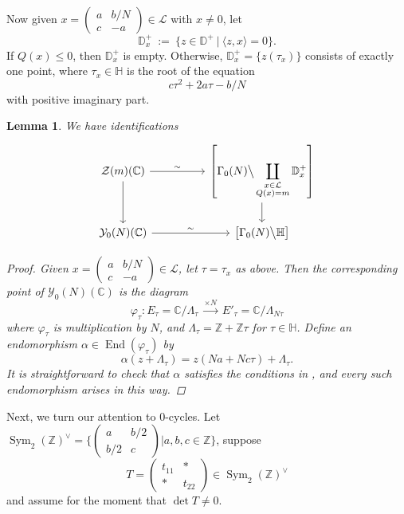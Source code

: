 \documentclass[reqno,oneside]{amsart}
\theoremstyle{plain}
\newtheorem{lemma}[theorem]{Lemma}
\theoremstyle{remark}
\numberwithin{theorem}{section}
\newcommand{\bbC}{\mathbb C}
\newcommand{\bbD}{\mathbb D}
\newcommand{\bbH}{\mathbb H}
\newcommand{\bbZ}{\mathbb Z}
\newcommand{\calL}{\mathcal L}
\newcommand{\calY}{\mathcal Y}
\newcommand{\psm}[1]{\left( \begin{smallmatrix}#1 \end{smallmatrix} \right)}
\DeclareMathOperator{\End}{End}
\DeclareMathOperator{\Sym}{Sym}
\begin{document}
	Now given $x  = \psm {a & b/N \\ c & -a } \in \calL$ with $x \neq 0$, let
	\begin{equation}
	\bbD^+_x \ := \ \{ z \in \bbD^+ \ | \ \langle z, x \rangle = 0  \}.
	\end{equation}
	If $Q(x) \leq 0$, then $\bbD^+_x$ is  empty. Otherwise, $\bbD^+_x = \{  z(\tau_x ) \}$  consists of exactly one point, where $\tau_x \in \bbH$ is the root of the equation
	\begin{equation}
	c \tau^2 + 2 a \tau - b/N
	\end{equation}	
	with positive imaginary part.
	
	\begin{lemma} We have identifications
		\begin{equation}
		\begin{tikzcd}
		\mathcal{Z}(m)(\mathbb C) \arrow[d] \arrow[rr, "\sim"] &  & { \displaystyle \left[ \Gamma_0(N) \big\backslash \coprod_{\substack{x \in \calL \\ Q(x) = m}} \bbD^+_x \right]} \arrow[d]     \\
		\mathcal{Y}_0(N)(\mathbb C) \arrow[rr, "\sim"]         &  & {\left[ \Gamma_0(N) \big\backslash \mathbb H \right]}
		\end{tikzcd}
		\end{equation}
		\begin{proof}
			Given $x = \psm{a & b/N \\ c & -a } \in \calL$, let $\tau=\tau_x$ as above. Then the corresponding point of $\calY_0(N)(\bbC)$ is the diagram
			\begin{equation} \label{eqn:complex moduli point}
			\varphi_{\tau} \colon E_{\tau} = \bbC /  \Lambda_{\tau}   \ \stackrel{\times N}{\longrightarrow}  \ E'_{\tau} = \bbC / \Lambda_{N\tau}
			\end{equation}
			where $\varphi_{\tau}$ is multiplication by $N$, and $\Lambda_{\tau} = \bbZ + \bbZ\tau$ for $\tau \in \bbH$. Define an endomorphism $\alpha \in \End(\varphi_{\tau})$ by
			\begin{equation}
			\alpha(z + \Lambda_{\tau}) = z  (Na + Nc \tau) + \Lambda_{\tau}.
			\end{equation}
			It is straightforward to check that $\alpha$ satisfies the conditions in ,
			and every such endomorphism arises in this way.
		\end{proof}
	\end{lemma}
	
	Next, we turn our attention to 0-cycles. Let $\Sym_2(\bbZ)^{\vee} = \{ \psm{a & b/2 \\ b/2 & c} | a,b,c \in \bbZ  \}$, suppose
	\begin{equation}
	T = \begin{pmatrix} t_{11} & * \\ * & t_{22} \end{pmatrix} \in \Sym_{2}(\bbZ)^{\vee}
	\end{equation}
	and assume for the moment that $\det T \neq 0$.
	
\end{document}
